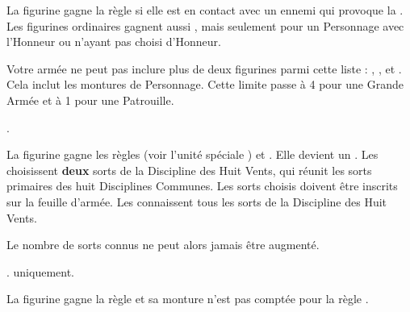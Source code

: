 \armyspecialruleentry{\valiant}

La figurine gagne la règle \stubborn{} si elle est en contact avec un ennemi qui provoque la \fear{}. Les figurines ordinaires gagnent aussi \bodyguard{\highprince{}, \commander{}}, mais seulement pour un Personnage avec l’Honneur \royalhuntsman{} ou n'ayant pas choisi d'Honneur.

\armyspecialruleentry{\lastoftheirkind}

Votre armée ne peut pas inclure plus de deux figurines parmi cette liste : \youngdragons{}, \dragons{}, \firephoenixes{} et \frostphoenixes{}. Cela inclut les montures de Personnage. Cette limite passe à 4 pour une Grande Armée et à 1 pour une Patrouille.

\closearmyspecialrules








\newpage
{}

\vspace{0.5cm}

\hfill
{}\oneofakind{}.\vspace{5pt}

La figurine gagne les règles \swordsworn{} (voir l'unité spéciale \swordmasters{}) et \masterofbalance{}. Elle devient un \textbf{}. Les \commanders{} choisissent \textbf{deux} sorts de la Discipline des Huit Vents, qui réunit les sorts primaires des huit Disciplines Communes. Les sorts choisis doivent être inscrits sur la feuille d'armée. Les \highprinces{} connaissent tous les sorts de la Discipline des Huit Vents.

\vspace{5pt}Le nombre de sorts connus ne peut alors jamais être augmenté.
\honourmulticols{}
\def\tempmounts{À pied uniquement=,}
\vspace*{-0.3cm}\mounts{\tempmounts}\columnbreak\phantom{debug}
\honourclosesidetext{}

\spacebetweenhonours{}

\oneofakind{}. \highprince{} uniquement.\vspace{5pt}

La figurine gagne la règle \devastatingcharge{} et sa monture n'est pas comptée pour la règle \lastoftheirkind{}.

